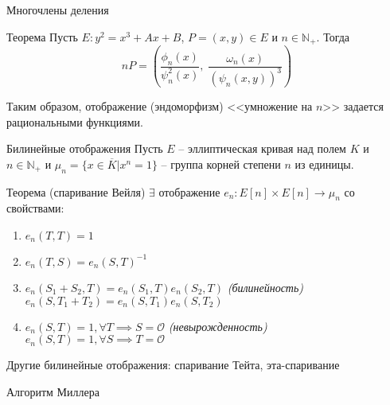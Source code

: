 \documentclass{beamer}
\begin{document}
\begin{frame}{Многочлены деления}
\begin{block}{Теорема}
    Пусть $E: {y^2} = {x^3} + Ax + B$, $P = \left( {x,y} \right) \in E$ и $n \in {\mathbb{N}_+ }$. Тогда
    $$nP = \left( {\frac{{{\phi _n}\left( x \right)}}{{\psi _n^2\left( x \right)}},\;\frac{{{\omega _n}\left( x \right)}}{{{{\left( {{\psi _n}\left( {x,y} \right)} \right)}^3}}}} \right)
    $$
\end{block}

Таким образом, отображение (эндоморфизм) <<умножение на $n$>> задается рациональными функциями.
\end{frame}


\begin{frame}{Билинейные отображения}
Пусть $E$ -- эллиптическая кривая над полем $K$ и $n \in \mathbb{N}_{+}$ и $\mu_n = \{x \in \overline{K} | x^n = 1\}$ -- группа корней степени $n$ из единицы.
    
\begin{block}{Теорема (спаривание Вейля)}
$\exists$ отображение
$
e_n: E[n] \times E[n] \rightarrow \mu_n
$
со свойствами:
\begin{enumerate}
\item $e_n(T,T) = 1$
\item $e_n(T,S) = e_n(S,T)^{-1}$
\item $e_n(S_1 + S_2, T) = e_n(S_1, T) e_n(S_2, T)$ \hfill \textit{(билинейность)} \\
$e_n(S, T_1 + T_2) = e_n(S, T_1) e_n(S, T_2)$
\item $e_n(S,T) = 1, \forall T \implies S = \mathcal{O}$ \hfill \textit{(невырожденность)}\\
$e_n(S,T) = 1, \forall S \implies T = \mathcal{O}$
\end{enumerate}
\end{block}

Другие билинейные отображения: спаривание Тейта, эта-спаривание
\end{frame}

\begin{frame}{Алгоритм Миллера}
\end{frame}
\end{document}
